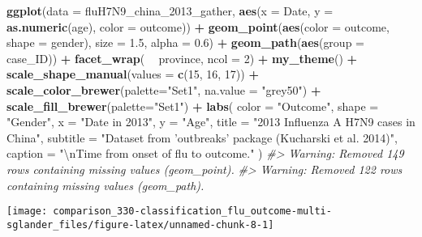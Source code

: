 \documentclass[]{book}
\newenvironment{Shaded}{\begin{snugshade}}{\end{snugshade}}
\newcommand{\CharTok}[1]{\textcolor[rgb]{0.31,0.60,0.02}{#1}}
\newcommand{\CommentTok}[1]{\textcolor[rgb]{0.56,0.35,0.01}{\textit{#1}}}
\newcommand{\DataTypeTok}[1]{\textcolor[rgb]{0.13,0.29,0.53}{#1}}
\newcommand{\DecValTok}[1]{\textcolor[rgb]{0.00,0.00,0.81}{#1}}
\newcommand{\FloatTok}[1]{\textcolor[rgb]{0.00,0.00,0.81}{#1}}
\newcommand{\KeywordTok}[1]{\textcolor[rgb]{0.13,0.29,0.53}{\textbf{#1}}}
\newcommand{\NormalTok}[1]{#1}
\newcommand{\OperatorTok}[1]{\textcolor[rgb]{0.81,0.36,0.00}{\textbf{#1}}}
\newcommand{\StringTok}[1]{\textcolor[rgb]{0.31,0.60,0.02}{#1}}
\begin{document}
\begin{Shaded}
\begin{Highlighting}[]
\KeywordTok{ggplot}\NormalTok{(}\DataTypeTok{data =}\NormalTok{ fluH7N9_china_}\DecValTok{2013}\NormalTok{_gather, }\KeywordTok{aes}\NormalTok{(}\DataTypeTok{x =}\NormalTok{ Date, }\DataTypeTok{y =} \KeywordTok{as.numeric}\NormalTok{(age), }
                                             \DataTypeTok{color =}\NormalTok{ outcome)) }\OperatorTok{+}
\StringTok{  }\KeywordTok{geom_point}\NormalTok{(}\KeywordTok{aes}\NormalTok{(}\DataTypeTok{color =}\NormalTok{ outcome, }\DataTypeTok{shape =}\NormalTok{ gender), }\DataTypeTok{size =} \FloatTok{1.5}\NormalTok{, }\DataTypeTok{alpha =} \FloatTok{0.6}\NormalTok{) }\OperatorTok{+}
\StringTok{  }\KeywordTok{geom_path}\NormalTok{(}\KeywordTok{aes}\NormalTok{(}\DataTypeTok{group =}\NormalTok{ case_ID)) }\OperatorTok{+}
\StringTok{  }\KeywordTok{facet_wrap}\NormalTok{( }\OperatorTok{~}\StringTok{ }\NormalTok{province, }\DataTypeTok{ncol =} \DecValTok{2}\NormalTok{) }\OperatorTok{+}
\StringTok{  }\KeywordTok{my_theme}\NormalTok{() }\OperatorTok{+}
\StringTok{  }\KeywordTok{scale_shape_manual}\NormalTok{(}\DataTypeTok{values =} \KeywordTok{c}\NormalTok{(}\DecValTok{15}\NormalTok{, }\DecValTok{16}\NormalTok{, }\DecValTok{17}\NormalTok{)) }\OperatorTok{+}
\StringTok{  }\KeywordTok{scale_color_brewer}\NormalTok{(}\DataTypeTok{palette=}\StringTok{"Set1"}\NormalTok{, }\DataTypeTok{na.value =} \StringTok{"grey50"}\NormalTok{) }\OperatorTok{+}
\StringTok{  }\KeywordTok{scale_fill_brewer}\NormalTok{(}\DataTypeTok{palette=}\StringTok{"Set1"}\NormalTok{) }\OperatorTok{+}
\StringTok{  }\KeywordTok{labs}\NormalTok{(}
    \DataTypeTok{color =} \StringTok{"Outcome"}\NormalTok{,}
    \DataTypeTok{shape =} \StringTok{"Gender"}\NormalTok{,}
    \DataTypeTok{x =} \StringTok{"Date in 2013"}\NormalTok{,}
    \DataTypeTok{y =} \StringTok{"Age"}\NormalTok{,}
    \DataTypeTok{title =} \StringTok{"2013 Influenza A H7N9 cases in China"}\NormalTok{,}
    \DataTypeTok{subtitle =} \StringTok{"Dataset from 'outbreaks' package (Kucharski et al. 2014)"}\NormalTok{,}
    \DataTypeTok{caption =} \StringTok{"}\CharTok{\textbackslash{}n}\StringTok{Time from onset of flu to outcome."}
\NormalTok{  )}
\CommentTok{#> Warning: Removed 149 rows containing missing values (geom_point).}
\CommentTok{#> Warning: Removed 122 rows containing missing values (geom_path).}
\end{Highlighting}
\end{Shaded}

\begin{center}\texttt{[image: comparison\_330-classification\_flu\_outcome-multi-sglander\_files/figure-latex/unnamed-chunk-8-1]} \end{center}
\end{document}

